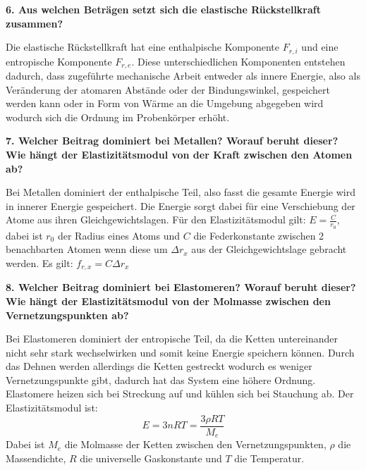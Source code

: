 \noindent\textbf{6. Aus welchen Beträgen setzt sich die elastische Rückstellkraft zusammen?}\\
\begin{addmargin}[25pt]{0pt}
Die elastische Rückstellkraft hat eine enthalpische Komponente $F_{r,i}$ und eine entropische Komponente $F_{r,e}$. Diese unterschiedlichen Komponenten entstehen dadurch, dass zugeführte mechanische Arbeit entweder als innere Energie, also als Veränderung der atomaren Abstände oder der Bindungswinkel, gespeichert werden kann oder in Form von Wärme an die Umgebung abgegeben wird wodurch sich die Ordnung im Probenkörper erhöht.\\
\end{addmargin} 


\noindent\textbf{7. Welcher Beitrag dominiert bei Metallen? Worauf beruht dieser? Wie hängt der Elastizitätsmodul von der Kraft zwischen den Atomen ab?}\\
\begin{addmargin}[25pt]{0pt}
Bei Metallen dominiert der enthalpische Teil, also fasst die gesamte Energie wird in innerer Energie gespeichert. Die Energie sorgt dabei für eine Verschiebung der Atome aus ihren Gleichgewichtslagen. Für den Elastizitätsmodul gilt: $E= \frac{C}{r_0}$, dabei ist $r_0$ der Radius eines Atoms und $C$ die Federkonstante zwischen 2 benachbarten Atomen wenn diese um $\Delta r_x$ aus der Gleichgewichtslage gebracht werden. Es gilt: $f_{r,x} = C \Delta r_x$\\
\end{addmargin} 


\noindent\textbf{8. Welcher Beitrag dominiert bei Elastomeren? Worauf beruht dieser? Wie hängt der Elastizitätsmodul von der Molmasse zwischen den Vernetzungspunkten ab?}\\
\begin{addmargin}[25pt]{0pt}
Bei Elastomeren dominiert der entropische Teil, da die Ketten untereinander nicht sehr stark wechselwirken und somit keine Energie speichern können. Durch das Dehnen werden allerdings die Ketten gestreckt wodurch es weniger Vernetzungspunkte gibt, dadurch hat das System eine höhere Ordnung. Elastomere heizen sich bei Streckung auf und kühlen sich bei Stauchung ab. Der Elastizitätsmodul ist:
\begin{equation}\label{eq:E_Modul_Elastomere}
    E = 3nRT = \frac{3\rho RT}{M_e}
\end{equation}
Dabei ist $M_e$ die Molmasse der Ketten zwischen den Vernetzungspunkten, $\rho$ die Massendichte, $R$ die universelle Gaskonstante  und $T$ die Temperatur.
\end{addmargin} 

